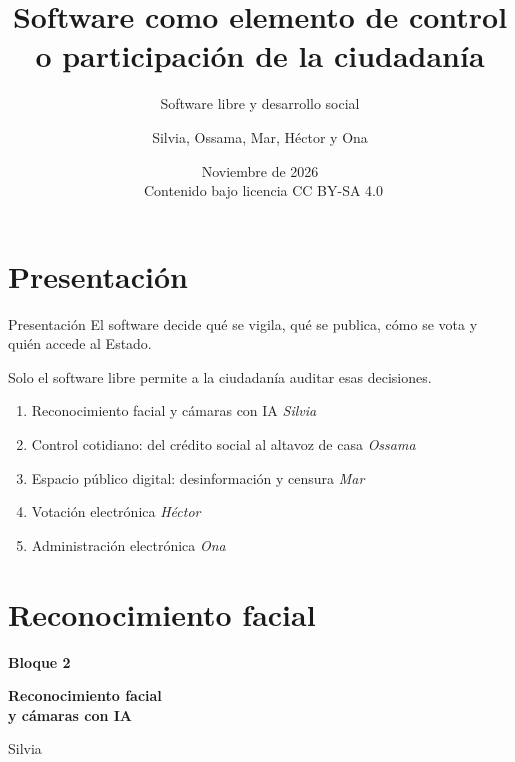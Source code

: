 \documentclass[aspectratio=169,12pt]{beamer}
\title[Software: control o participación]{Software como elemento de control o participación de la ciudadanía}
\subtitle{Software libre y desarrollo social}
\author[Grupo SLDS]{Silvia, Ossama, Mar, Héctor y Ona}
\institute{UPC}
\date{Noviembre de 2026\\[0.3cm]{\small\ccbysa\ Contenido bajo licencia CC BY-SA 4.0}}
\newcommand{\bloque}[3]{%
  \begin{frame}[plain]
    \vfill
    \begin{center}
      {\color{terra}\large\bfseries Bloque #1}\\[0.3cm]
      {\color{azul}\LARGE\bfseries #2\par}\vspace{0.5cm}
      {\large #3}
    \end{center}
    \vfill
  \end{frame}}
\begin{document}
\begin{frame}
  \titlepage
\end{frame}

\section{Presentación}
\begin{frame}{Presentación}
  \vspace{0.2cm}
  {\large\alert{El software decide qué se vigila, qué se publica, cómo se vota y quién accede al Estado.}}

  Solo el software libre permite a la ciudadanía auditar esas decisiones.
  \vspace{0.3cm}
  \begin{enumerate}
    \item Reconocimiento facial y cámaras con IA \hfill \textit{Silvia}
    \item Control cotidiano: del crédito social al altavoz de casa \hfill \textit{Ossama}
    \item Espacio público digital: desinformación y censura \hfill \textit{Mar}
    \item Votación electrónica \hfill \textit{Héctor}
    \item Administración electrónica \hfill \textit{Ona}
  \end{enumerate}
\end{frame}

\section{Reconocimiento facial}
\bloque{2}{Reconocimiento facial\\y cámaras con IA}{Silvia}
\end{document}
